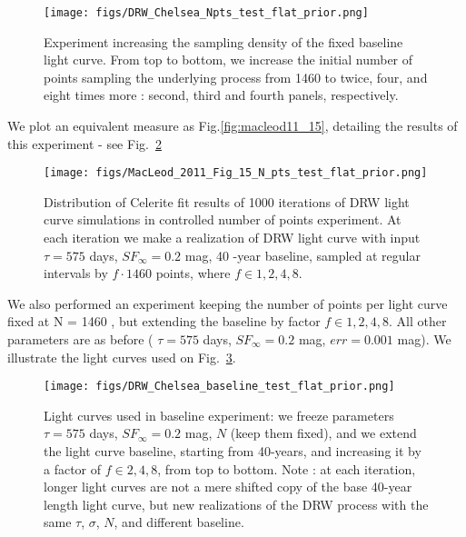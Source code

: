 \documentclass[fleqn,usenatbib]{mnras}  %
\begin{document}
\begin{figure}
\texttt{[image: figs/DRW\_Chelsea\_Npts\_test\_flat\_prior.png]}
\caption{Experiment increasing the sampling density of the fixed baseline light curve. From top to bottom, we increase the initial number of points sampling the underlying process from 1460 to twice, four, and eight times more : second, third and fourth panels, respectively. }
\label{fig:Npts_experiment}
\end{figure}


We plot an equivalent measure as Fig.\ref{fig:macleod11_15}, detailing the results of this experiment - see Fig.~\ref{fig:macleod11_15_Npts}




\begin{figure}
\texttt{[image: figs/MacLeod\_2011\_Fig\_15\_N\_pts\_test\_flat\_prior.png]}
\caption{Distribution of Celerite fit results of 1000 iterations of DRW light curve simulations in controlled number of points experiment. At  each iteration we make a realization of DRW light curve with input $\tau=575$ days, $SF_{\infty}=0.2$ mag, 40 -year baseline, sampled at regular intervals by $f \cdot 1460 $ points,  where $f \in {1,2,4,8}$.}
\label{fig:macleod11_15_Npts}
\end{figure}


We also performed an experiment keeping the number of points per light curve fixed at N = 1460 , but extending the baseline by factor $f \in {1,2,4,8}$. All other parameters are as before ( $\tau = 575$ days, $SF_{\infty} = 0.2$ mag, $err = 0.001$ mag). We illustrate the light curves used on Fig.~\ref{fig:lc_length}.

\begin{figure}
\texttt{[image: figs/DRW\_Chelsea\_baseline\_test\_flat\_prior.png]}
\caption{Light curves used in baseline experiment: we freeze parameters   $\tau=575 $ days, $SF_{\infty}=0.2$ mag, $N$ (keep them fixed), and we extend the light curve baseline, starting from 40-years, and increasing it by a factor of $f \in {2,4,8}$, from top to bottom. Note : at each iteration, longer light curves are not a mere shifted copy of the base 40-year length light curve, but new realizations of the DRW process with the same $\tau$, $\sigma$, $N$, and different baseline.}
\label{fig:lc_length}
\end{figure}

% 
\end{document}
